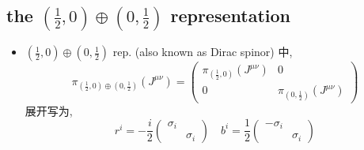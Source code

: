 \subsection{the \texorpdfstring{$(\frac{1}{2}, 0) \oplus (0, \frac{1}{2})$}{(1/2, 0)+(0, 1/2)} representation}
\begin{itemize}
	\item $(\frac{1}{2}, 0) \oplus (0, \frac{1}{2})$ rep. (also known as Dirac spinor) 中,
	\begin{equation}
		\pi_{(\frac{1}{2}, 0) \oplus (0, \frac{1}{2})}(J^{\mu \nu}) = \begin{pmatrix}
			\pi_{(\frac{1}{2}, 0)}(J^{\mu \nu}) & 0 \\
			0 & \pi_{(0, \frac{1}{2})}(J^{\mu \nu})
		\end{pmatrix}
	\end{equation}
	展开写为,
	\begin{equation}
		r^i = - \frac{i}{2} \begin{pmatrix}
			\sigma_i & \\
			& \sigma_i
		\end{pmatrix} \quad b^i = \frac{1}{2} \begin{pmatrix}
			- \sigma_i & \\
			& \sigma_i
		\end{pmatrix}
	\end{equation}
\end{itemize}

